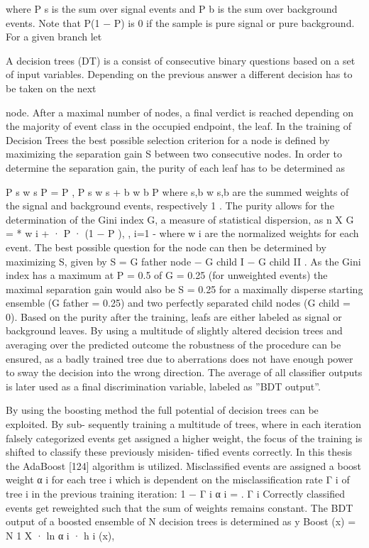 where P
s
is the sum over signal events and P
b
is the
sum over background events. Note that P(1 − P) is 0
if the sample is pure signal or pure background. For a
given branch let






A decision trees (DT) is a consist of consecutive binary questions based on a set of input
variables. Depending on the previous answer a different decision has to be taken on the next

node. After a maximal number of nodes, a final verdict is reached depending on the majority of
event class in the occupied endpoint, the leaf.
In the training of Decision Trees the best possible selection criterion for a node is defined by
maximizing the separation gain S between two consecutive nodes. In order to determine the
separation gain, the purity of each leaf has to be determined as

P
s w s
P = P
,
P
s w s + b w b
P
where s,b w s,b are the summed weights of the signal and background events, respectively 1 .
The purity allows for the determination of the Gini index G, a measure of statistical dispersion,
as
n
X
G = * w i + · P · (1 − P ),
, i=1 -
where w i are the normalized weights for each event. The best possible question for the node
can then be determined by maximizing S, given by
S = G father node − G child I − G child II .
As the Gini index has a maximum at P = 0.5 of G = 0.25 (for unweighted events) the maximal
separation gain would also be S = 0.25 for a maximally disperse starting ensemble (G father =
0.25) and two perfectly separated child nodes (G child = 0). Based on the purity after the training,
leafs are either labeled as signal or background leaves.
By using a multitude of slightly altered decision trees and averaging over the predicted outcome
the robustness of the procedure can be ensured, as a badly trained tree due to aberrations does
not have enough power to sway the decision into the wrong direction. The average of all
classifier outputs is later used as a final discrimination variable, labeled as ”BDT output”.


By using the boosting method the full potential of decision trees can be exploited. By sub-
sequently training a multitude of trees, where in each iteration falsely categorized events get
assigned a higher weight, the focus of the training is shifted to classify these previously misiden-
tified events correctly.
In this thesis the AdaBoost [124] algorithm is utilized. Misclassified events are assigned a boost
weight α i for each tree i which is dependent on the misclassification rate Γ i of tree i in the
previous training iteration:
1 − Γ i
α i =
.
Γ i
Correctly classified events get reweighted such that the sum of weights remains constant. The
BDT output of a boosted ensemble of N decision trees is determined as
y Boost (x) =
N
1 X
·
ln α i · h i (x),



